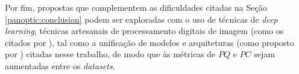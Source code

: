 Por fim, propostas que complementem as dificuldades citadas na Seção \ref{panoptic:conclusion} podem ser exploradas com o uso de técnicas de \textit{deep learning}, técnicas artesanais de processamento digitais de imagem (como os citados por \cite{pedrini2008analise}), tal como a unificação de modelos e arquiteturas (como proposto por \cite{Liu2019}) citadas nesse trabalho, de modo que às métricas de $PQ$ e $PC$ sejam aumentadas entre os \textit{datasets}.
